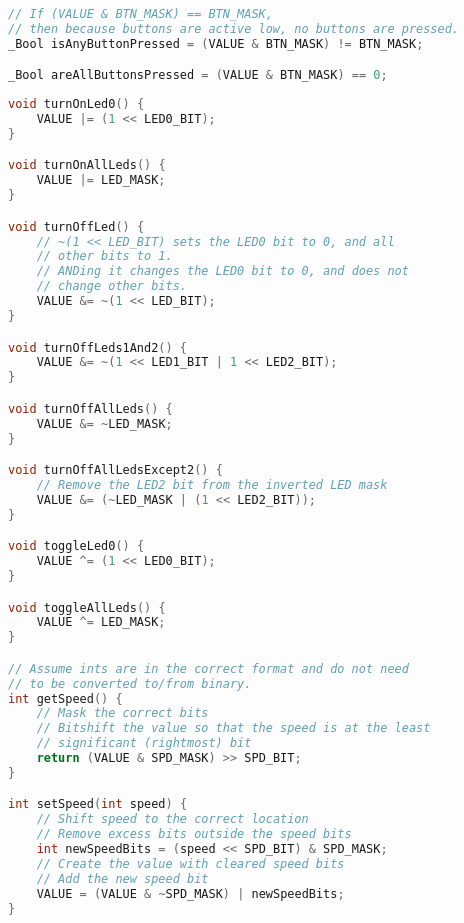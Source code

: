\begin{easylist}
\begin{lstlisting}[language=C, columns=fixed]
// If (VALUE & BTN_MASK) == BTN_MASK,
// then because buttons are active low, no buttons are pressed.
_Bool isAnyButtonPressed = (VALUE & BTN_MASK) != BTN_MASK;

_Bool areAllButtonsPressed = (VALUE & BTN_MASK) == 0;
\end{lstlisting}

\clearpage

\begin{lstlisting}[language=C, columns=fixed]
void turnOnLed0() {
	VALUE |= (1 << LED0_BIT);
}

void turnOnAllLeds() {
	VALUE |= LED_MASK;
}

void turnOffLed() {
	// ~(1 << LED_BIT) sets the LED0 bit to 0, and all
	// other bits to 1.
	// ANDing it changes the LED0 bit to 0, and does not
	// change other bits.
	VALUE &= ~(1 << LED_BIT);
}

void turnOffLeds1And2() {
	VALUE &= ~(1 << LED1_BIT | 1 << LED2_BIT);
}

void turnOffAllLeds() {
	VALUE &= ~LED_MASK;
}

void turnOffAllLedsExcept2() {
	// Remove the LED2 bit from the inverted LED mask
	VALUE &= (~LED_MASK | (1 << LED2_BIT));
}

void toggleLed0() {
	VALUE ^= (1 << LED0_BIT);
}

void toggleAllLeds() {
	VALUE ^= LED_MASK;
}

// Assume ints are in the correct format and do not need 
// to be converted to/from binary.
int getSpeed() {
	// Mask the correct bits
	// Bitshift the value so that the speed is at the least
	// significant (rightmost) bit
	return (VALUE & SPD_MASK) >> SPD_BIT;
}

int setSpeed(int speed) {
	// Shift speed to the correct location
	// Remove excess bits outside the speed bits
	int newSpeedBits = (speed << SPD_BIT) & SPD_MASK;
	// Create the value with cleared speed bits
	// Add the new speed bit
	VALUE = (VALUE & ~SPD_MASK) | newSpeedBits;
}
\end{lstlisting}

\end{easylist}
\clearpage
